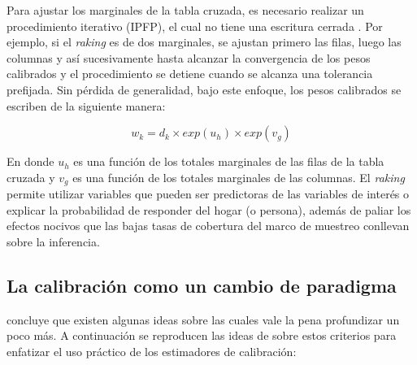 \documentclass[
  12pt,
  spanish,
]{book}
\begin{document}
Para ajustar los marginales de la tabla cruzada, es necesario realizar un procedimiento iterativo (IPFP), el cual no tiene una escritura cerrada \citep[capítulo 10]{Gutierrez_2016}. Por ejemplo, si el \emph{raking} es de dos marginales, se ajustan primero las filas, luego las columnas y así sucesivamente hasta alcanzar la convergencia de los pesos calibrados y el procedimiento se detiene cuando se alcanza una tolerancia prefijada. Sin pérdida de generalidad, bajo este enfoque, los pesos calibrados se escriben de la siguiente manera:

\[w_k = d_k \times exp(u_h) \times exp(v_g)\]

En donde \(u_h\) es una función de los totales marginales de las filas de la tabla cruzada y \(v_g\) es una función de los totales marginales de las columnas. El \emph{raking} permite utilizar variables que pueden ser predictoras de las variables de interés o explicar la probabilidad de responder del hogar (o persona), además de paliar los efectos nocivos que las bajas tasas de cobertura del marco de muestreo conllevan sobre la inferencia.

\hypertarget{la-calibraciuxf3n-como-un-cambio-de-paradigma}{%
\subsection{La calibración como un cambio de paradigma}\label{la-calibraciuxf3n-como-un-cambio-de-paradigma}}

\citet{Sar08} concluye que existen algunas ideas sobre las cuales vale la pena profundizar un poco más. A continuación se reproducen las ideas de \citet{Gutierrez_2016} sobre estos criterios para enfatizar el uso práctico de los estimadores de calibración:
\end{document}
